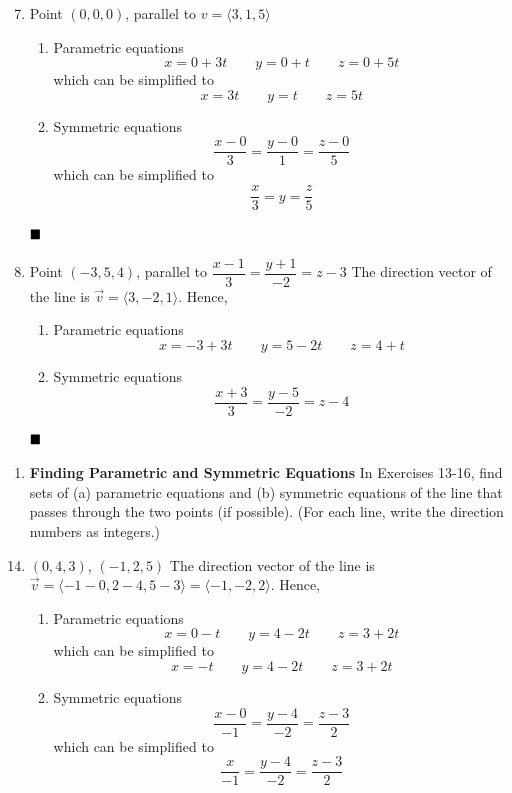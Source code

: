 \begin{enumerate}
    \setcounter{enumi}{6}
    \item Point $(0, 0, 0)$, parallel to $v = \langle 3, 1, 5 \rangle$ \sol{}
          \begin{enumerate}
              \item Parametric equations
                    \[x = 0 + 3t \qquad y = 0 + t \qquad z = 0 + 5t\]
                    which can be simplified to
                    \[x = 3t \qquad y = t \qquad z = 5t\]
              \item Symmetric equations
                    \[\frac{x - 0}{3} = \frac{y - 0}{1} = \frac{z - 0}{5}\]
                    which can be simplified to
                    \[\frac{x}{3} = y = \frac{z}{5}\]
          \end{enumerate} $\hfill\blacksquare$

          \setcounter{enumi}{11}
    \item Point $(-3, 5, 4)$, parallel to $\dfrac{x-1}{3}=\dfrac{y+1}{-2}=z-3$ \sol{} The
          direction vector of the line is $\vec{v} = \langle 3, -2, 1 \rangle$. Hence,
          \begin{enumerate}
              \item Parametric equations
                    \[x = -3 + 3t \qquad y = 5 - 2t \qquad z = 4 + t\]
              \item Symmetric equations
                    \[\frac{x + 3}{3} = \frac{y - 5}{-2} = z - 4\]
          \end{enumerate} $\hfill\blacksquare$
\end{enumerate}

\begin{enumerate}[label={}, leftmargin=*]
    \item \textbf{Finding Parametric and Symmetric Equations} In Exercises 13-16, find sets of (a)
          parametric equations and (b) symmetric equations of the line that passes
          through the two points (if possible). (For each line, write the direction
          numbers as integers.)
\end{enumerate}

\begin{enumerate}
    \setcounter{enumi}{13}

    \item $(0, 4, 3)$, $(-1, 2, 5)$
          \sol{}
          The direction vector of the line is $\vec{v} = \langle -1 - 0, 2 - 4, 5 - 3 \rangle = \langle -1, -2, 2 \rangle$. Hence,

          \begin{enumerate}
              \item Parametric equations
                    \[x = 0 - t \qquad y = 4 - 2t \qquad z = 3 + 2t\]
                    which can be simplified to
                    \[x = -t \qquad y = 4 - 2t \qquad z = 3 + 2t\]
              \item Symmetric equations
                    \[\frac{x - 0}{-1} = \frac{y - 4}{-2} = \frac{z - 3}{2}\]
                    which can be simplified to
                    \[\frac{x}{-1} = \frac{y - 4}{-2} = \frac{z - 3}{2}\]
          \end{enumerate}
\end{enumerate}

